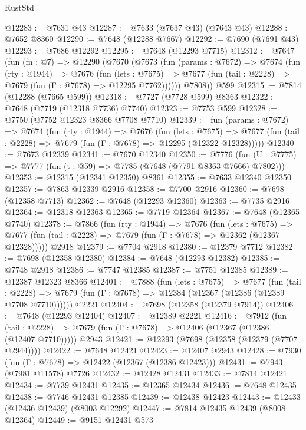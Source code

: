 \begin{lexlean}{RustStd}
\begin{coremodule}
{\begin{coremodule}
{{{{{{{{{{{{{{{{{{{{{{{{{{{{{{{{{{{{{{{{{{{{{{{{{{{{{@12283 := @7631 @43
@12287 := @7633 (@7637 @43) (@7643 @43)
@12288 := @7652 @8360
@12290 := @7648 (@12288 @7667)
@12292 := @7690 (@7691 @43)
@12293 := @7686 @12292
@12295 := @7648 (@12293 @7715)
@12312 := @7647
    (fun (fn : @7) =>
    @12290
      (@7670
        (@7673
          (fun (params : @7672) =>
          @7674
            (fun (rty : @1944) =>
            @7676
              (fun (lets : @7675) =>
              @7677 (fun (tail : @2228) => @7679 (fun (Γ : @7678) => @12295 @7762))))))
        @7808))
    @599
@12315 := @7814 (@12288 (@7665 @599))
@12318 := @7727 (@7728 @599) @8363
@12322 := @7648 (@7719 (@12318 @7736) @7740)
@12323 := @7753 @599
@12328 := @7750 (@7752 @12323 @8366 @7708 @7710)
@12339 := fun (params : @7672) =>
  @7674
    (fun (rty : @1944) =>
    @7676
      (fun (lets : @7675) =>
      @7677 (fun (tail : @2228) => @7679 (fun (Γ : @7678) => @12295 (@12322 @12328)))))
@12340 := @7673 @12339
@12341 := @7670 @12340
@12350 := @7776
    (fun (U : @7775) => @7777 (fun (t : @59) => @7785 (@7648 (@7791 @8363 @7666) @7802)))
@12353 := @12315 (@12341 @12350) @8361
@12355 := @7633 @12340 @12350
@12357 := @7863 @12339 @2916
@12358 := @7700 @2916
@12360 := @7698 (@12358 @7713)
@12362 := @7648 (@12293 @12360)
@12363 := @7735 @2916
@12364 := @12318 @12363
@12365 := @7719 @12364
@12367 := @7648 (@12365 @7740)
@12378 := @7866
    (fun (rty : @1944) =>
    @7676
      (fun (lets : @7675) =>
      @7677 (fun (tail : @2228) => @7679 (fun (Γ : @7678) => @12362 (@12367 @12328)))))
    @2918
@12379 := @7704 @2918
@12380 := @12379 @7712
@12382 := @7698 (@12358 @12380)
@12384 := @7648 (@12293 @12382)
@12385 := @7748 @2918
@12386 := @7747 @12385
@12387 := @7751 @12385
@12389 := @12387 @12323 @8366
@12401 := @7888
    (fun (lets : @7675) =>
    @7677
      (fun (tail : @2228) =>
      @7679 (fun (Γ : @7678) => @12384 (@12367 (@12386 (@12389 @7708 @7710))))))
    @2221
@12404 := @7698 (@12358 (@12379 @7914))
@12406 := @7648 (@12293 @12404)
@12407 := @12389 @2221
@12416 := @7912
    (fun (tail : @2228) => @7679 (fun (Γ : @7678) => @12406 (@12367 (@12386 (@12407 @7710)))))
    @2943
@12421 := @12293 (@7698 (@12358 (@12379 (@7707 @2944))))
@12422 := @7648 @12421
@12423 := @12407 @2943
@12428 := @7930 (fun (Γ : @7678) => @12422 (@12367 (@12386 @12423)))
@12431 := @7943 (@7981 @11578) @7726
@12432 := @12428 @12431
@12433 := @7814 @12421
@12434 := @7739 @12431
@12435 := @12365 @12434
@12436 := @7648 @12435
@12438 := @7746 @12431 @12385
@12439 := @12438 @12423
@12443 := @12433 (@12436 @12439) (@8003 @12292)
@12447 := @7814 @12435 @12439 (@8008 @12364)
@12449 := @9151 @12431 @573
}}}}}}}}}}}}}}}}}}}}}}}}}}}}}}}}}}}}}}}}}}}}}}}}}}}}}
\end{coremodule}}
\end{coremodule}
\end{lexlean}
